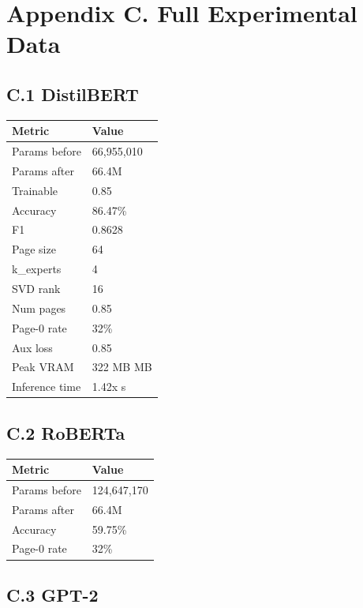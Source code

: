 \section{Appendix C. Full Experimental Data}

\subsection{C.1 DistilBERT}

\begin{table}[H]
\centering
\small
\begin{tabular}{ll}
\toprule
\textbf{Metric} & \textbf{Value} \\
\midrule
Params before & 66,955,010 \\
Params after & 66.4M \\
Trainable & 0.85 \\
Accuracy & 86.47\% \\
F1 & 0.8628 \\
Page size & 64 \\
k\_experts & 4 \\
SVD rank & 16 \\
Num pages & 0.85 \\
Page-0 rate & 32\% \\
Aux loss & 0.85 \\
Peak VRAM & 322 MB MB \\
Inference time & 1.42x s \\
\bottomrule
\end{tabular}
\end{table}

\subsection{C.2 RoBERTa}

\begin{table}[H]
\centering
\small
\begin{tabular}{ll}
\toprule
\textbf{Metric} & \textbf{Value} \\
\midrule
Params before & 124,647,170 \\
Params after & 66.4M \\
Accuracy & 59.75\% \\
Page-0 rate & 32\% \\
\bottomrule
\end{tabular}
\end{table}

\subsection{C.3 GPT-2}


